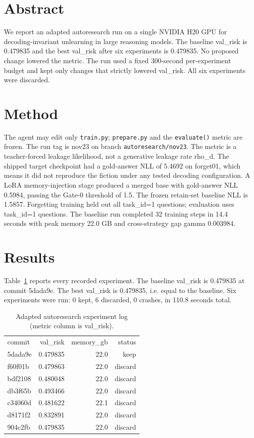 \documentclass{article}
\begin{document}
\section{Abstract}
We report an adapted autoresearch run on a single NVIDIA H20 GPU for decoding-invariant
unlearning in large reasoning models. The baseline val\_risk is 0.479835 and the best
val\_risk after six experiments is 0.479835. No proposed change lowered the metric.
The run used a fixed 300-second per-experiment budget and kept only changes that
strictly lowered val\_risk. All six experiments were discarded.

\section{Method}
The agent may edit only \texttt{train.py}; \texttt{prepare.py} and the
\texttt{evaluate()} metric are frozen. The run tag is nov23 on branch
\texttt{autoresearch/nov23}. The metric is a teacher-forced leakage likelihood,
not a generative leakage rate rho\_d.
The shipped target checkpoint had a gold-answer NLL of 5.4692 on forget01, which
means it did not reproduce the fiction under any tested decoding configuration.
A LoRA memory-injection stage produced a merged base with gold-answer NLL 0.5984,
passing the Gate-0 threshold of 1.5. The frozen retain-set baseline NLL is 1.5857.
Forgetting training held out all task\_id=1 questions; evaluation uses task\_id=1
questions. The baseline run completed 32 training steps in 14.4 seconds with
peak memory 22.0 GB and cross-strategy gap gamma 0.003984.

\section{Results}
Table~\ref{tab:main} reports every recorded experiment. The baseline val\_risk
is 0.479835 at commit 5dada9e. The best val\_risk is 0.479835, i.e. equal to the
baseline. Six experiments were run: 0 kept, 6 discarded, 0 crashes, in 110.8
seconds total.

\begin{table}[h]
\caption{Adapted autoresearch experiment log (metric column is val\_risk).}
\label{tab:main}
\begin{tabular}{lrrr}
commit & val\_risk & memory\_gb & status \\
5dada9e & 0.479835 & 22.0 & keep \\
f60f01b & 0.479863 & 22.0 & discard \\
bdf2108 & 0.480048 & 22.0 & discard \\
db3f65b & 0.493466 & 22.0 & discard \\
c34060d & 0.481622 & 22.1 & discard \\
d8171f2 & 0.832891 & 22.0 & discard \\
904c2fb & 0.479835 & 22.0 & discard \\
\end{tabular}
\end{table}
\end{document}
